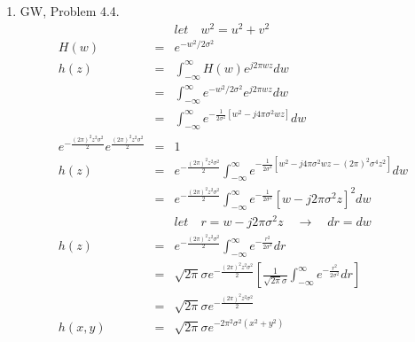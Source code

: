 \documentclass[10pt,letterpaper,oneside,onecolumn,leqno,fleqn]{article}
\begin{document}
\begin{enumerate}
    \pagebreak
    \item
      GW, Problem 4.4.
      \begin{eqnarray*}
               &&  let \quad w^2 = u^2 + v^2 \\
        H(w)   &=& e^{-w^2/2\sigma^2} \\
        h(z)   &=& \int_{-\infty}^{\infty}H(w)e^{j2\pi wz}dw \\
               &=& \int_{-\infty}^{\infty}e^{-w^2/2\sigma^2}e^{j2\pi wz}dw \\
               &=& \int_{-\infty}^{\infty}e^{-\frac{1}{2\sigma^2}\left[
                   w^2-j4\pi\sigma^2wz\right]}dw \\
        e^{-\frac{(2\pi)^2z^2\sigma^2}{2}}e^{\frac{(2\pi)^2z^2\sigma^2}{2}} &=& 1 \\
        h(z)   &=& e^{-\frac{(2\pi)^2z^2\sigma^2}{2}} \int_{-\infty}^{\infty}
                   e^{-\frac{1}{2\sigma^2}\left[w^2-j4\pi\sigma^2wz-
                   (2\pi)^2\sigma^4z^2\right]}dw \\
               &=& e^{-\frac{(2\pi)^2z^2\sigma^2}{2}} \int_{-\infty}^{\infty}
                   e^{-\frac{1}{2\sigma^2}}\left[w-j2\pi\sigma^2z\right]^2dw \\
               &&  let \quad r = w - j2\pi\sigma^2z \quad \to \quad dr = dw \\
        h(z)   &=& e^{-\frac{(2\pi)^2z^2\sigma^2}{2}} \int_{-\infty}^{\infty}
                   e^{-\frac{r^2}{2\sigma^2}} dr \\
               &=& \sqrt{2\pi}\sigma e^{-\frac{(2\pi)^2z^2\sigma^2}{2}}
                   \left[\frac{1}{\sqrt{2\pi}\sigma}\int_{-\infty}^{\infty}
                   e^{-\frac{r^2}{2\sigma^2}}dr \right] \\
               &=& \sqrt{2\pi}\sigma e^{-\frac{(2\pi)^2z^2\sigma^2}{2}} \\
        h(x,y) &=& \sqrt{2\pi}\sigma e^{-2\pi^2\sigma^2(x^2+y^2)}
      \end{eqnarray*}


\end{enumerate}
\end{document}
